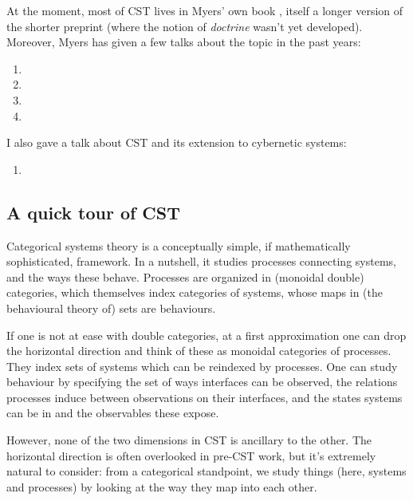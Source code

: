 At the moment, most of CST lives in Myers' own book \cite{myers_categorical_2022}, itself a longer version of the shorter preprint \cite{myers_double_2020} (where the notion of \emph{doctrine} wasn't yet developed).
Moreover, Myers has given a few talks about the topic in the past years:
\begin{enumerate}
	\item {}
	\item {}
	\item {}
	\item {}
\end{enumerate}
I also gave a talk about CST and its extension to cybernetic systems:
\begin{enumerate}[resume]
	\item {}
\end{enumerate}

\subsection{A quick tour of CST}
Categorical systems theory is a conceptually simple, if mathematically sophisticated, framework.
In a nutshell, it studies processes connecting systems, and the ways these behave. Processes are organized in (monoidal double) categories, which themselves index categories of systems, whose maps in (the behavioural theory of) sets are behaviours.

If one is not at ease with double categories, at a first approximation one can drop the horizontal direction and think of these as monoidal categories of processes. They index sets of systems which can be reindexed by processes. One can study behaviour by specifying the set of ways interfaces can be observed, the relations processes induce between observations on their interfaces, and the states systems can be in and the observables these expose.

However, none of the two dimensions in CST is ancillary to the other.
The horizontal direction is often overlooked in pre-CST work, but it's extremely natural to consider: from a categorical standpoint, we study things (here, systems and processes) by looking at the way they map into each other.

